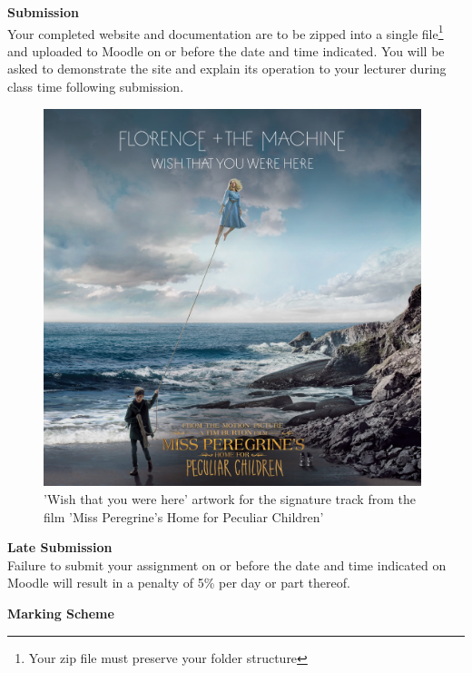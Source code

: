 \textbf{Submission}\\
Your completed website and documentation are to be zipped into a single file\footnote{Your zip file must preserve your folder structure} and uploaded to Moodle on or before the date and time indicated.  You will be asked to demonstrate the site and explain its operation to your lecturer during class time following submission.




\vspace{1cm}
\begin{figure}[h!t]
	\centering
	\includegraphics[width = 11cm]{img/wishthatyouwerehere.jpg}
	\caption{'Wish that you were here' artwork for the signature track from the film 'Miss Peregrine's Home for Peculiar Children'}
	\label{fig:reverso}
\end{figure}



\textbf{Late Submission}\\
Failure to submit your assignment on or before the date and time indicated on Moodle will result in a penalty of 5\% per day or part thereof.

\vspace{0.5cm}
\newpage
\textbf{Marking Scheme}\\


